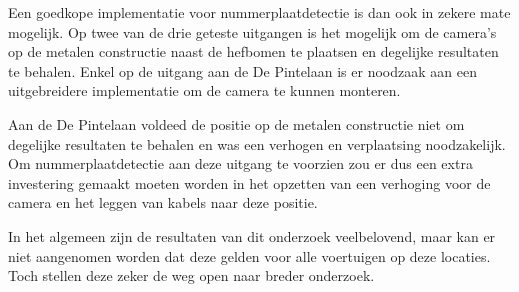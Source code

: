 Een goedkope implementatie voor nummerplaatdetectie is dan ook in zekere mate mogelijk. Op twee van de drie geteste uitgangen is het mogelijk om de camera's op de metalen constructie naast de hefbomen te plaatsen en degelijke resultaten te behalen. Enkel op de uitgang aan de De Pintelaan is er noodzaak aan een uitgebreidere implementatie om de camera te kunnen monteren.

Aan de De Pintelaan voldeed de positie op de metalen constructie niet om degelijke resultaten te behalen en was een verhogen en verplaatsing noodzakelijk. Om nummerplaatdetectie aan deze uitgang te voorzien zou er dus een extra investering gemaakt moeten worden in het opzetten van een verhoging voor de camera en het leggen van kabels naar deze positie.

In het algemeen zijn de resultaten van dit onderzoek veelbelovend, maar kan er niet aangenomen worden dat deze gelden voor alle voertuigen op deze locaties. Toch stellen deze zeker de weg open naar breder onderzoek.

